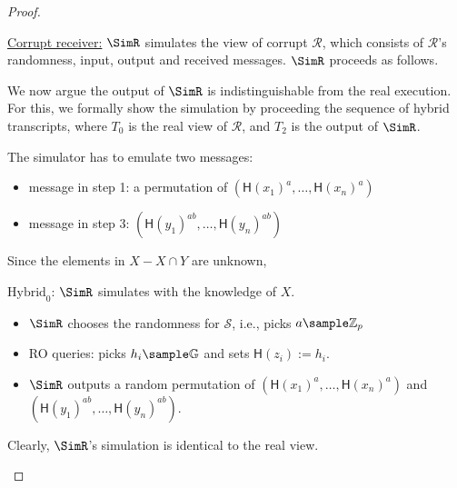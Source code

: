 \begin{proof}
\begin{trivlist}
\item \underline{Corrupt receiver:} $\SimR$ simulates the view of corrupt $\mathcal{R}$, 
which consists of $\mathcal{R}$'s randomness, input, output and received messages. $\SimR$ proceeds as follows. 

We now argue the output of $\SimR$ is indistinguishable from the real execution. 
For this, we formally show the simulation by proceeding the sequence of hybrid transcripts, 
where $T_0$ is the real view of $\mathcal{R}$, and $T_2$ is the output of $\SimR$. 

The simulator has to emulate two messages: 
\begin{itemize}
    \item message in step 1: a permutation of $(\mathsf{H}(x_1)^a, \dots, \mathsf{H}(x_n)^a)$
    \item message in step 3: $(\mathsf{H}(y_1)^{ab}, \dots, \mathsf{H}(y_n)^{ab})$
\end{itemize}
Since the elements in $X - X \cap Y$ are unknown, 


\item $\text{Hybrid}_0$: $\SimR$ simulates with the knowledge of $X$. 
\begin{itemize}
    \item $\SimR$ chooses the randomness for $\mathcal{S}$, i.e., picks $a \sample \mathbb{Z}_p$
    
    \item RO queries: picks $h_i \sample \mathbb{G}$ and sets $\mathsf{H}(z_i):=h_i$. 

    \item $\SimR$ outputs a random permutation of $(\mathsf{H}(x_1)^a, \dots, \mathsf{H}(x_n)^a)$ and 
        $(\mathsf{H}(y_1)^{ab}, \dots, \mathsf{H}(y_n)^{ab})$.     
\end{itemize}
Clearly, $\SimR$'s simulation is identical to the real view. 

\begin{center}
\end{center}


\end{trivlist}
\end{proof}
